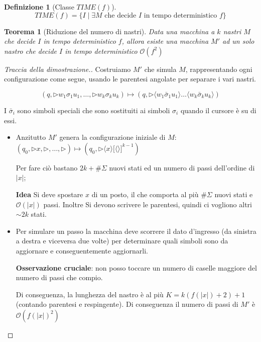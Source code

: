 \documentclass[a4paper,10pt,oneside]{article}
\theoremstyle{break}
\newtheorem{deff}{Definizione}[section]
\newtheorem{teo}{Teorema}[subsection]
\newcommand{\bigo}{\mathcal O}
\begin{document}
\begin{deff}[Classe $TIME(f)$]
\[TIME(f) = \{I \mid \exists M \text{ che decide } I \text{ in tempo deterministico  }f\}\]
\end{deff}

\begin{mdframed}
 
\begin{teo}[Riduzione del numero di nastri]
 Data una macchina a $k$ nastri $M$ che decide $I$ in tempo deterministico $f$, allora esiste una macchina $M'$ ad un solo nastro che decide $I$ in tempo deterministico $\bigo (f^2)$
\end{teo}

\begin{proof}[Traccia della dimostrazione.] Costruiamo $M'$ che simula $M$, rappresentando ogni configurazione come segue, usando le parentesi angolate per separare i vari nastri.

 \[ (q, \triangleright w_1\sigma_1u_1, \hdots, \triangleright w_k\sigma_ku_k )  \mapsto (q, \triangleright \langle w_1\bar\sigma_1u_1 \rangle \hdots \langle w_k\bar\sigma_ku_k \rangle) \]

 I $\bar \sigma_i$ sono simboli speciali che sono sostituiti ai simboli $\sigma_i$ quando il cursore è su di essi.
 
\begin{itemize}
 \item Anzitutto $M'$ genera la configurazione iniziale di $M$: $ (q_0, \triangleright x, \triangleright , \hdots, \triangleright )  \mapsto (q_0, \triangleright \langle x\rangle \big [\langle\rangle\big]^{k-1}) $
 
 Per fare ciò bastano $2k + \#\Sigma$ nuovi stati ed un numero di passi dell'ordine di $|x|$;
 
 \textbf{Idea} Si deve spostare $x$ di un posto, il che comporta al più $\#\Sigma$ nuovi stati e $\bigo(|x|)$ passi. Inoltre Si devono scrivere le parentesi, quindi ci vogliono altri $\sim 2k$ stati.

 \item Per simulare un passo la macchina deve scorrere il dato d'ingresso (da sinistra a destra e viceversa due volte) per determinare quali simboli sono da aggiornare e conseguentemente aggiornarli. 
 
 \textbf{Osservazione cruciale}: non posso toccare un numero di caselle maggiore del numero di passi che compio.
 
 Di conseguenza, la lunghezza del nastro è al più $K = k(f(|x|) + 2) + 1$ (contando parentesi e respingente). Di conseguenza il numero di passi di $M'$ è $\bigo (f(|x|)^2)$
 \end{itemize}
\end{proof}
\end{mdframed}
\newpage
\end{document}
